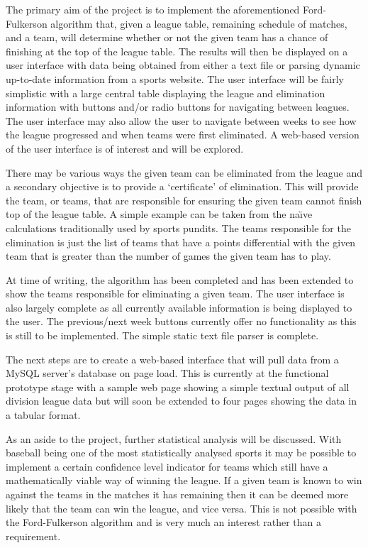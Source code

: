 \documentclass[11pt]{article}
\begin{document}
The primary aim of the project is to implement the aforementioned
Ford-Fulkerson algorithm that, given a league table, remaining schedule of
matches, and a team, will determine whether or not the given team has a
chance of finishing at the top of the league table. The results will then
be displayed on a user interface with data being obtained from either a text
file or parsing dynamic up-to-date information from a sports website. The user
interface will be fairly simplistic with a large central table displaying the 
league and elimination information with buttons and/or radio buttons for 
navigating between leagues. The user interface may also allow the user to 
navigate between weeks to see how the league progressed and when teams were 
first eliminated. A web-based version of the user interface is of interest and 
will be explored.

There may be various ways the given team can be eliminated from the league
and a secondary objective is to provide a `certificate' of elimination. This
will provide the team, or teams, that are responsible for ensuring the given
team cannot finish top of the league table. A simple example can be taken
from the na\"{\i}ve calculations traditionally used by sports pundits. The
teams responsible for the elimination is just the list of teams that have a
points differential with the given team that is greater than the number of 
games the given team has to play.

At time of writing, the algorithm has been completed and has been extended to 
show the teams responsible for eliminating a given team. The user interface is 
also largely complete as all currently available information is being displayed 
to the user. The previous/next week buttons currently offer no functionality as 
this is still to be implemented. The simple static text file parser is 
complete.

The next steps are to create a web-based interface that will pull data from a 
MySQL server's database on page load. This is currently at the functional 
prototype stage with a sample web page showing a simple textual output of all 
division league data but will soon be extended to four pages showing the data 
in a tabular format.

As an aside to the project, further statistical analysis will be discussed.
With baseball being one of the most statistically analysed sports it may be
possible to implement a certain confidence level indicator for teams which
still have a mathematically viable way of winning the league. If a given team
is known to win against the teams in the matches it has remaining then it can
be deemed more likely that the team can win the league, and vice versa. This
is not possible with the Ford-Fulkerson algorithm and is very much an interest
rather than a requirement.
\end{document}
